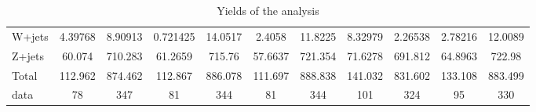 \documentclass[10pt]{article}
\begin{document}
\begin{table}[htbp]
\begin{center}
\begin{tabular}{|l|S|S|S|S|S|S|S|S|S|S|}
  W+jets   & 4.39768  & 8.90913  & 0.721425  & 14.0517  & 2.4058  & 11.8225  & 8.32979  & 2.26538  & 2.78216  & 12.0089  \\ 
  Z+jets   & 60.074  & 710.283  & 61.2659  & 715.76  & 57.6637  & 721.354  & 71.6278  & 691.812  & 64.8963  & 722.98  \\ 
\hline 
  Total  & 112.962  & 874.462  & 112.867  & 886.078  & 111.697  & 888.838  & 141.032  & 831.602  & 133.108  & 883.499  \\ 
\hline 
  data   & 78 & 347 & 81 & 344 & 81 & 344 & 101 & 324 & 95 & 330 \\ 
\hline 
\end{tabular} 
\caption{Yields of the analysis} 
\end{center} 
\end{table} 
\end{document}
